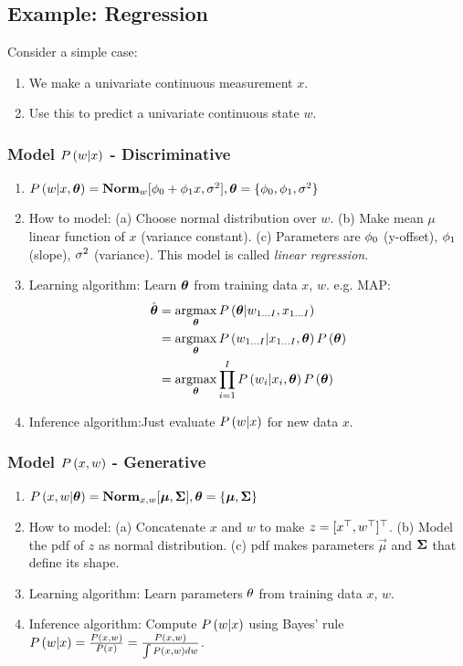 \subsection{Example: Regression}

Consider a simple case:
	\begin{enumerate}
		\item We make a univariate continuous measurement $x$.
		\item Use this to predict a univariate continuous state $w$.
	\end{enumerate}

\subsubsection*{Model $\P{w|x}$ - Discriminative}
	\begin{enumerate}
		\item $\P{w|x,\vec{\th}}=\Norm_w[\ph_0+\ph_1x,\si^2], \vec{\th}=\{\ph_0,\ph_1,\si^2\}$
		\item How to model: (a) Choose normal distribution over $w$. (b) Make mean $\mu$ linear function of $x$ (variance constant). (c) Parameters are $\ph_0$ (y-offset), $\ph_1$ (slope), $\si^2$ (variance). This model is called \textit{linear regression}.
		\item Learning algorithm: Learn $\vec{\th}$ from training data $x$, $w$. e.g. MAP:
		\begin{align*}
		\hat{\vec{\th}}&=\argmax_{\vec{\th}}\P{\vec{\th}|w_{1\dots I},x_{1\dots I}} \\
		&=\argmax_{\vec{\th}}\P{w_{1\dots I}|x_{1\dots I},\vec{\th}}\P{\vec{\th}} \\
		&=\argmax_{\vec{\th}}\prod_{i=1}^I\P{w_i|x_i,\vec{\th}}\P{\vec{\th}}
		\end{align*}
		\item Inference algorithm:Just evaluate $\P{w|x}$ for new data $x$.
	\end{enumerate}

\subsubsection*{Model $\P{x,w}$ - Generative}
	\begin{enumerate}
		\item $\P{x,w|\vec{\th}}=\Norm_{x,w}[\vec{\mu},\cov], \vec{\th}=\{\vec{\mu},\cov\}$
		\item How to model: (a) Concatenate $x$ and $w$ to make $z=[x\T,w\T]\T$. (b) Model the pdf of $z$ as normal distribution. (c) pdf makes parameters $\vec{\mu}$ and $\cov$ that define its shape.
		\item Learning algorithm: Learn parameters $\th$ from training data $x$, $w$.
		\item Inference algorithm: Compute $\P{w|x}$ using Bayes' rule $\P{w|x}=\frac{\P{x,w}}{\P{x}}=\frac{\P{x,w}}{\int\P{x,w}dw}$.
	\end{enumerate}


